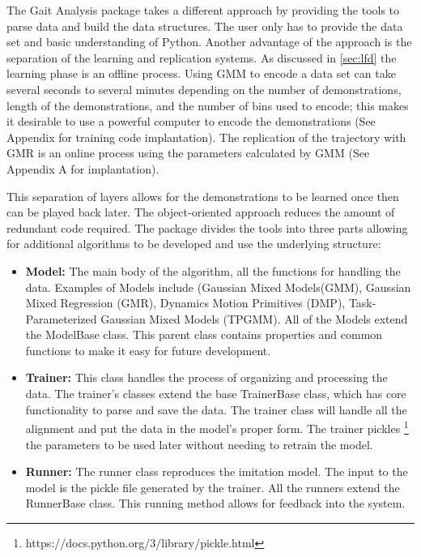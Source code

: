 The Gait Analysis package takes a different approach by providing the tools to parse data and build the data structures. The user only has to provide the data set and basic understanding of Python. Another advantage of the approach is the separation of the learning and replication systems. As discussed in \autoref{sec:lfd} the learning phase is an offline process. Using GMM to encode a data set can take several seconds to several minutes depending on the number of demonstrations, length of the demonstrations, and the number of bins used to encode; this makes it desirable to use a powerful computer to encode the demonstrations (See Appendix for training code implantation). The replication of the trajectory with GMR is an online process using the parameters calculated by GMM (See Appendix A for implantation). 

This separation of layers allows for the demonstrations to be learned once then can be played back later. The object-oriented approach reduces the amount of redundant code required. The package divides the tools into three parts allowing for additional algorithms to be developed and use the underlying structure: 

\begin{itemize}[noitemsep]
    \item \textbf{Model:} The main body of the algorithm, all the functions for handling the data. Examples of Models include (Gaussian Mixed Models(GMM), Gaussian Mixed Regression (GMR), Dynamics Motion Primitives (DMP), Task-Parameterized Gaussian Mixed Models (TPGMM). All of the Models extend the ModelBase class. This parent class contains properties and common functions to make it easy for future development.
    \item \textbf{Trainer:} This class handles the process of organizing and processing the data. The trainer's classes extend the base TrainerBase class, which has core functionality to parse and save the data. The trainer class will handle all the alignment and put the data in the model's proper form. The trainer pickles \footnote{https://docs.python.org/3/library/pickle.html} the parameters to be used later without needing to retrain the model. 
    \item \textbf{Runner:} The runner class reproduces the imitation model. The input to the model is the pickle file generated by the trainer. All the runners extend the RunnerBase class. This running method allows for feedback into the system. 
\end{itemize}


